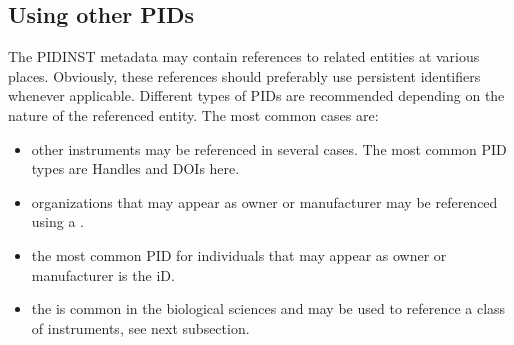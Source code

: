 \documentclass[a4paper,10pt,english]{sphinxmanual}
\begin{document}
\subsection{Using other PIDs}
\label{\detokenize{white-paper/metadata-schema-recommendations:using-other-pids}}
\sphinxAtStartPar
The PIDINST metadata may contain references to related entities at
various places.  Obviously, these references should preferably use
persistent identifiers whenever applicable.  Different types of PIDs
are recommended depending on the nature of the referenced entity.  The
most common cases are:
\begin{itemize}
\item {} 
\sphinxAtStartPar
other instruments may be referenced in several cases.  The most
common PID types are Handles and DOIs here.

\item {} 
\sphinxAtStartPar
organizations that may appear as owner or manufacturer may be
referenced using a .

\item {} 
\sphinxAtStartPar
the most common PID for individuals that may appear as owner or
manufacturer is the  iD.

\item {} 
\sphinxAtStartPar
the  is common in the biological sciences and may be used to
reference a class of instruments, see next subsection.

\end{itemize}
\end{document}
